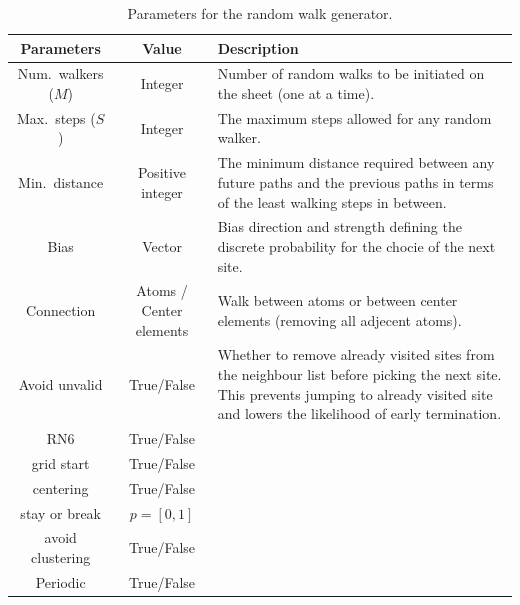\begin{table}[H]
  \begin{center}
  \caption{Parameters for the random walk generator.}
  \label{tab:RW_params}
  \begin{tabular}{ | c | c | m{8cm} |} \hline
  \textbf{Parameters} & \textbf{Value} & \textbf{Description}  \\ \hline
  Num.\ walkers ($M$) & Integer & Number of random walks to be initiated on the sheet (one at a time). \\ \hline
  Max.\ steps ($S$)  & Integer &The maximum steps allowed for any random walker. \\ \hline
  Min.\ distance  & Positive integer &The minimum distance required between any future paths and the previous paths in terms of the least walking steps in between. \\ \hline
  Bias  & Vector & Bias direction and strength defining the discrete probability for the chocie of the next site. \\ \hline
  Connection  & Atoms / Center elements & Walk between atoms or between center elements (removing all adjecent atoms). \\ \hline
  Avoid unvalid  & True/False & Whether to remove already visited sites from the neighbour list before picking the next site. This prevents jumping to already visited site and lowers the likelihood of early termination.  \\ \hline
  RN6  & True/False & \\ \hline
  grid start  & True/False & \\ \hline
  centering  & True/False & \\ \hline
  stay or break  & $p = [0,1]$ & \\ \hline
  avoid clustering  & True/False & \\ \hline
  Periodic  & True/False & \\ \hline
  \end{tabular}
  \end{center}
\end{table}

